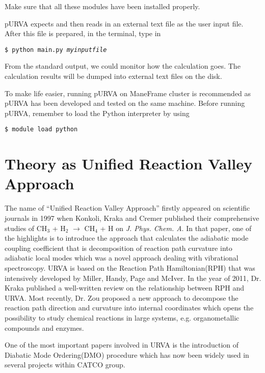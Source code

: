 Make sure that all these modules have been installed properly.



pURVA expects and then reads in an external text file as the user input file. After this file is prepared, in the terminal, type in 

\texttt{\$ python main.py \textit{myinputfile}}

From the standard output, we could monitor how the calculation goes. The calculation results will be dumped into external text files on the disk.

To make life easier, running pURVA on ManeFrame cluster is recommended as pURVA has been developed and tested on the same machine. Before running pURVA, remember to load the Python interpreter by using 

\texttt{\$ module load python}


\section{Theory as Unified Reaction Valley Approach}
The name of ``Unified Reaction Valley Approach'' firstly appeared on scientific journals in 1997 when Konkoli, Kraka and Cremer published their comprehensive studies of CH$_3$ + H$_2$ $\rightarrow$ CH$_4$ + H on \textit{J. Phys. Chem. A}\cite{firsturva}. In that paper, one of the highlights is to introduce the approach that calculates the adiabatic mode coupling coefficient that is decomposition of reaction path curvature into adiabatic local modes which was a novel approach dealing with vibrational spectroscopy. URVA is based on the Reaction Path Hamiltonian(RPH) that was intensively developed by Miller, Handy\cite{MillerHandy}, Page and McIver\cite{PageMcIver}. In the year of 2011, Dr. Kraka published a well-written review on the relationship between RPH and URVA\cite{Krakareview}. Most recently, Dr. Zou proposed a new approach to decompose the reaction path direction and curvature into internal coordinates which opens the possibility to study chemical reactions in large systems, e.g. organometallic compounds and enzymes\cite{Zou2016}.  

One of the most important papers involved in URVA is the introduction of Diabatic Mode Ordering(DMO) procedure which has now been widely used in several projects within CATCO group\cite{dmopaper}.










